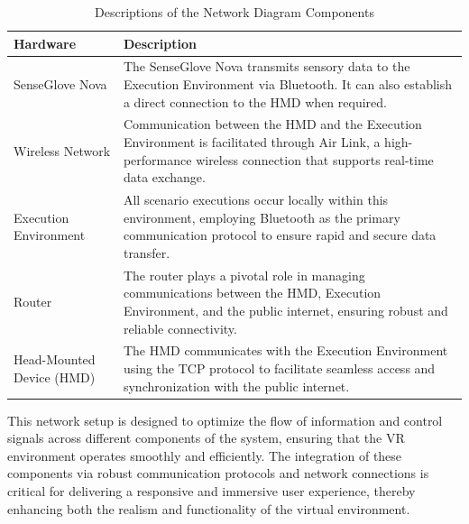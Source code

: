 \begin{table}[htbp]
\centering
\begin{tabular}{|p{3cm}|p{9cm}|}
\hline
\textbf{Hardware} & \textbf{Description} \\
\hline
SenseGlove Nova & The SenseGlove Nova transmits sensory data to the Execution Environment via Bluetooth. It can also establish a direct connection to the \ac{HMD} when required. \\
\hline
Wireless Network & Communication between the \ac{HMD} and the Execution Environment is facilitated through Air Link, a high-performance wireless connection that supports real-time data exchange. \\
\hline
Execution Environment & All scenario executions occur locally within this environment, employing Bluetooth as the primary communication protocol to ensure rapid and secure data transfer. \\
\hline
Router & The router plays a pivotal role in managing communications between the \ac{HMD}, Execution Environment, and the public internet, ensuring robust and reliable connectivity. \\
\hline
Head-Mounted Device (\ac{HMD}) & The \ac{HMD} communicates with the Execution Environment using the TCP protocol to facilitate seamless access and synchronization with the public internet. \\
\hline
\end{tabular}
\caption{Descriptions of the Network Diagram Components}
\label{tab:NetworkDiagram}
\end{table}
\noindent
This network setup is designed to optimize the flow of information and control signals across different components of the system, ensuring that the \ac{VR} environment operates smoothly and efficiently. The integration of these components via robust communication protocols and network connections is critical for delivering a responsive and immersive user experience, thereby enhancing both the realism and functionality of the virtual environment.

